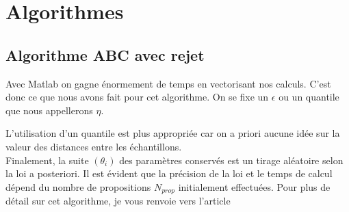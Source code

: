 \chapter{Algorithmes} \label{algos}

\section{Algorithme ABC avec rejet}\label{algo_rejet}
Avec Matlab on gagne énormement de temps en vectorisant nos calculs. C'est donc ce que nous avons fait pour cet algorithme. On se fixe un $\epsilon$ ou un quantile que nous appellerons $\eta$.




L'utilisation d'un quantile est plus appropriée car on a priori aucune idée sur la valeur des distances entre les échantillons.\\
Finalement, la suite $(\theta_i)$ des paramètres conservés est un tirage aléatoire selon la loi a posteriori. Il est évident que la précision de la loi et le temps de calcul dépend du nombre de propositions $N_{prop}$ initialement effectuées. Pour plus de détail sur cet algorithme, je vous renvoie vers l'article 


